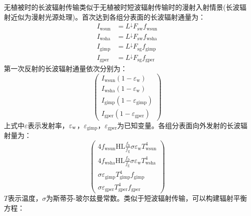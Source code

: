 无植被时的长波辐射传输类似于无植被时短波辐射传输时的漫射入射情景(长波辐射近似为漫射光源处理)。首次达到各组分表面的长波辐射通量为：
\begin{equation}
  \begin{aligned} I_{\mathrm{wsun}} &=L ^\downarrow F_{\mathrm{s w}} f_{\mathrm{wsun}} \\ I_{\mathrm{wsha}} &=L^\downarrow F_{\mathrm{s w}} f_{\mathrm{wsha}} \\ I_{\mathrm{gimp}} &=L^\downarrow F_{\mathrm{s g}} f_{\mathrm{gimp}} \\ I_{\mathrm{gper}} &=L^\downarrow F_{\mathrm{s g}} f_{\mathrm{gper}} \end{aligned}
\end{equation}
第一次反射的长波辐射通量依次分别为：
\begin{equation}
  \left(\begin{array}{c}I_{\mathrm{wsun}}\left(1-\varepsilon_{\mathrm{w}}\right) \\ I_{\mathrm{wsha}}\left(1-\varepsilon_{\mathrm{w}}\right) \\ I_{\mathrm{gimp}}\left(1-\varepsilon_{\mathrm{gimp}}\right) \\ I_{\mathrm{gper}}\left(1-\varepsilon_{\mathrm{gper}}\right)\end{array}\right)
\end{equation}
上式中$\varepsilon$表示发射率，$\varepsilon_{\rm w}$，$\varepsilon_{\mathrm{gimp}}$，$\varepsilon_{\mathrm{gper}}$为已知变量。各组分表面向外发射的长波辐射量为：
\begin{equation}
  \left(\begin{array}{c}4 f_{\mathrm{wsun}} \mathrm{HL}  \frac{f_{\mathrm{b}}}{f_{\mathrm{g}}}  \sigma \varepsilon_{\mathrm{w}} T_{\mathrm{wsun}}^{4} \\
    4 f_{\mathrm{wsha}} \mathrm{HL}  \frac{f_{\mathrm{b}}}{f_{\mathrm{g}}}  \sigma \varepsilon_{\mathrm{w}} T_{\mathrm{wsha}}^{4} \\
    \sigma \varepsilon_{\mathrm{gimp}} T_{\mathrm{gimp}}^{4} f_{\mathrm{gimp}} \\
  \sigma \varepsilon_{\mathrm{gper}} T_{\mathrm{gper}}^{4} f_{\mathrm{gper}}\end{array}\right)
\end{equation}
$T$表示温度，$\sigma$为斯蒂芬-玻尔兹曼常数。类似于短波辐射传输，可以构建辐射平衡方程：
